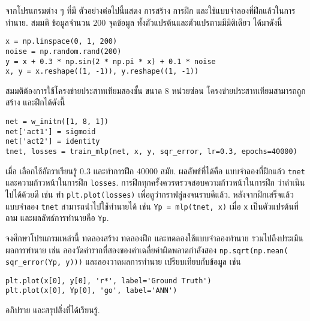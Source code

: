 \begin{Exercise}
จากโปรแกรมต่าง ๆ ที่มี
ตัวอย่างต่อไปนี้แสดง การสร้าง การฝึก และใช้แบบจำลองที่ฝึกแล้วในการทำนาย.
สมมติ ข้อมูลจำนวน $200$ จุดข้อมูล ทั้งตัวแปรต้นและตัวแปรตามมีมิติเดียว ได้มาดังนี้
\begin{Verbatim}[fontsize=\small]
x = np.linspace(0, 1, 200)
noise = np.random.rand(200)
y = x + 0.3 * np.sin(2 * np.pi * x) + 0.1 * noise
x, y = x.reshape((1, -1)), y.reshape((1, -1))
\end{Verbatim}

สมมติต้องการใช้โครงข่ายประสาทเทียมสองชั้น
ขนาด $8$ หน่วยซ่อน
โครงข่ายประสาทเทียมสามารถถูกสร้าง
และฝึกได้ดังนี้
%
\begin{Verbatim}[fontsize=\small]
net = w_initn([1, 8, 1])
net['act1'] = sigmoid
net['act2'] = identity
tnet, losses = train_mlp(net, x, y, sqr_error, lr=0.3, epochs=40000)
\end{Verbatim}
เมื่อ เลือกใช้อัตราเรียนรู้ $0.3$ และทำการฝึก $40000$ สมัย.
ผลลัพธ์ที่ได้คือ แบบจำลองที่ฝึกแล้ว \verb|tnet| 
และความก้าวหน้าในการฝึก \verb|losses|.
การฝึกทุกครั้งควรตรวจสอบความก้าวหน้าในการฝึก
ว่าดำเนินไปได้ด้วยดี เช่น ทำ \verb|plt.plot(losses)|
เพื่อดูว่ากราฟลู่ลงจนราบดีแล้ว.
หลังจากฝึกเสร็จแล้ว
แบบจำลอง \verb|tnet|
สามารถนำไปใช้ทำนายได้
เช่น \verb|Yp = mlp(tnet, x)|
เมื่อ \verb|x| เป็นตัวแปรต้นที่ถาม 
และผลลัพธ์การทำนายคือ \verb|Yp|.

จงศึกษาโปรแกรมเหล่านี้
ทดลองสร้าง ทดลองฝึก และทดลองใช้แบบจำลองทำนาย
รวมไปถึงประเมินผลการทำนาย 
เช่น ลองวัดค่ารากที่สองของค่าเฉลี่ยค่าผิดพลาดกำลังสอง 
\texttt{np.sqrt(np.mean(}
\verb|sqr_error(Yp, y)))|
และลองวาดผลการทำนาย เปรียบเทียบกับข้อมูล
เช่น 
\begin{Verbatim}[fontsize=\small]
plt.plot(x[0], y[0], 'r*', label='Ground Truth')
plt.plot(x[0], Yp[0], 'go', label='ANN')
\end{Verbatim}
อภิปราย และสรุปสิ่งที่ได้เรียนรู้.

\end{Exercise}


